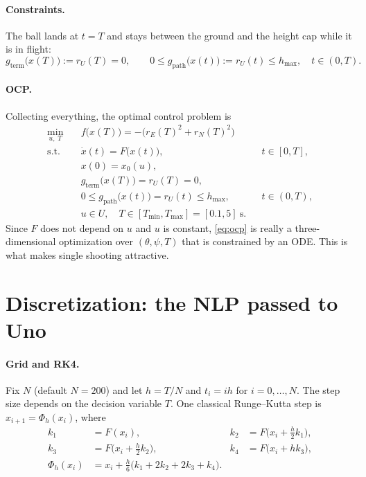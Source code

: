 \documentclass[11pt]{article}
\begin{document}
\paragraph{Constraints.} The ball lands at $t=T$ and stays between the ground and the height cap
while it is in flight:
\[
  g_{\mathrm{term}}\bigl(x(T)\bigr) := r_U(T) = 0,\qquad
  0 \le g_{\mathrm{path}}\bigl(x(t)\bigr) := r_U(t) \le h_{\max},\quad t\in(0,T).
\]

\paragraph{OCP.} Collecting everything, the optimal control problem is
\begin{equation}
\begin{aligned}
  \min_{u,\;T}\quad & f\bigl(x(T)\bigr) = -\bigl(r_E(T)^2 + r_N(T)^2\bigr)\\
  \text{s.t.}\quad & \dot x(t) = F\bigl(x(t)\bigr), && t\in[0,T],\\
  & x(0) = x_0(u),\\
  & g_{\mathrm{term}}\bigl(x(T)\bigr) = r_U(T) = 0,\\
  & 0 \le g_{\mathrm{path}}\bigl(x(t)\bigr) = r_U(t) \le h_{\max}, && t\in(0,T),\\
  & u \in U,\quad T \in [T_{\min}, T_{\max}] = [0.1, 5]\ \mathrm{s}.
\end{aligned}
\tag{ocp}\label{eq:ocp}
\end{equation}
Since $F$ does not depend on $u$ and $u$ is constant, \eqref{eq:ocp} is really a
three-dimensional optimization over $(\theta,\psi,T)$ that is constrained by an ODE. This is what
makes single shooting attractive.

\section{Discretization: the NLP passed to Uno}\label{sec:disc}

\paragraph{Grid and RK4.} Fix $N$ (default $N=200$) and let $h = T/N$ and $t_i = i h$ for
$i=0,\dots,N$. The step size depends on the decision variable $T$. One classical Runge--Kutta
step is $x_{i+1} = \Phi_h(x_i)$, where
\begin{equation}
\begin{aligned}
  k_1 &= F(x_i), & k_2 &= F\bigl(x_i + \tfrac h2 k_1\bigr),\\
  k_3 &= F\bigl(x_i + \tfrac h2 k_2\bigr), & k_4 &= F\bigl(x_i + h k_3\bigr),\\
  \Phi_h(x_i) &= x_i + \tfrac h6\bigl(k_1 + 2k_2 + 2k_3 + k_4\bigr).
\end{aligned}
\tag{rk4}\label{eq:rk4}
\end{equation}
\end{document}
